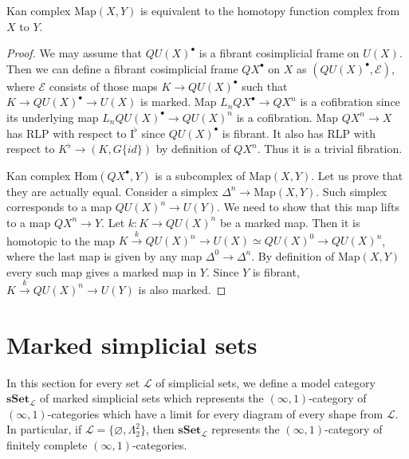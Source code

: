 \documentclass[reqno]{amsart}
\theoremstyle{definition}
\theoremstyle{remark}
\newcommand{\cat}[1]{\mathbf{#1}}
\newcommand{\sSet}{\cat{sSet}}
\newcommand{\Hom}{\mathrm{Hom}}
\newcommand{\Map}{\mathrm{Map}}
\newcommand{\I}{\mathrm{I}}
\numberwithin{figure}{section}
\begin{document}
\begin{lem}
Kan complex $\Map(X,Y)$ is equivalent to the homotopy function complex from $X$ to $Y$.
\end{lem}
\begin{proof}
We may assume that $QU(X)^\bullet$ is a fibrant cosimplicial frame on $U(X)$.
Then we can define a fibrant cosimplicial frame $QX^\bullet$ on $X$ as $(QU(X)^\bullet,\mathcal{E})$,
where $\mathcal{E}$ consists of those maps $K \to QU(X)^\bullet$ such that $K \to QU(X)^\bullet \to U(X)$ is marked.
Map $L_n QX^\bullet \to QX^n$ is a cofibration since its underlying map $L_n QU(X)^\bullet \to QU(X)^n$ is a cofibration.
Map $QX^n \to X$ has RLP with respect to $\I^\flat$ since $QU(X)^\bullet$ is fibrant.
It also has RLP with respect to $K^\flat \to (K, G \{id\})$ by definition of $QX^n$.
Thus it is a trivial fibration.

Kan complex $\Hom(QX^\bullet,Y)$ is a subcomplex of $\Map(X,Y)$.
Let us prove that they are actually equal.
Consider a simplex $\Delta^n \to \Map(X,Y)$.
Such simplex corresponds to a map $QU(X)^n \to U(Y)$.
We need to show that this map lifts to a map $QX^n \to Y$.
Let $k : K \to QU(X)^n$ be a marked map.
Then it is homotopic to the map $K \xrightarrow{k} QU(X)^n \to U(X) \simeq QU(X)^0 \to QU(X)^n$,
where the last map is given by any map $\Delta^0 \to \Delta^n$.
By definition of $\Map(X,Y)$ every such map gives a marked map in $Y$.
Since $Y$ is fibrant, $K \xrightarrow{k} QU(X)^n \to U(Y)$ is also marked.
\end{proof}

\section{Marked simplicial sets}

In this section for every set $\mathcal{L}$ of simplicial sets, we define a model category $\sSet_\mathcal{L}$ of marked simplicial sets
which represents the $(\infty,1)$-category of $(\infty,1)$-categories which have a limit for every diagram of every shape from $\mathcal{L}$.
In particular, if $\mathcal{L} = \{ \varnothing, \Lambda^2_2 \}$, then $\sSet_\mathcal{L}$ represents the $(\infty,1)$-category of finitely complete $(\infty,1)$-categories.
\end{document}
